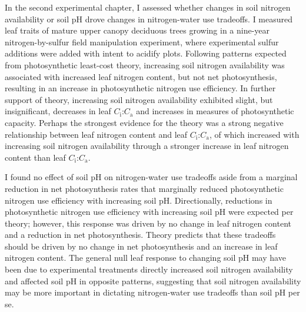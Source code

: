 In the second experimental chapter, I assessed whether changes in soil nitrogen availability or soil pH drove changes in nitrogen-water use tradeoffs. I measured leaf traits of mature upper canopy deciduous trees growing in a nine-year nitrogen-by-sulfur field manipulation experiment, where experimental sulfur additions were added with intent to acidify plots. Following patterns expected from photosynthetic least-cost theory, increasing soil nitrogen availability was associated with increased leaf nitrogen content, but not net photosynthesis, resulting in an increase in photosynthetic nitrogen use efficiency. In further support of theory, increasing soil nitrogen availability exhibited slight, but insignificant, decreases in leaf $C_\mathrm{i}$:$C_\mathrm{a}$ and increases in measures of photosynthetic capacity. Perhaps the strongest evidence for the theory was a strong negative relationship between leaf nitrogen content and leaf $C_\mathrm{i}$:$C_\mathrm{a}$, of which increased with increasing soil nitrogen availability through a stronger increase in leaf nitrogen content than leaf $C_\mathrm{i}$:$C_\mathrm{a}$.

I found no effect of soil pH on nitrogen-water use tradeoffs aside from a marginal reduction in net photosynthesis rates that marginally reduced photosynthetic nitrogen use efficiency with increasing soil pH. Directionally, reductions in photosynthetic nitrogen use efficiency with increasing soil pH were expected per theory; however, this response was driven by no change in leaf nitrogen content and a reduction in net photosynthesis. Theory predicts that these tradeoffs should be driven by no change in net photosynthesis and an increase in leaf nitrogen content. The general null leaf response to changing soil pH may have been due to experimental treatments directly increased soil nitrogen availability and affected soil pH in opposite patterns, suggesting that soil nitrogen availability may be more important in dictating nitrogen-water use tradeoffs than soil pH per se.

